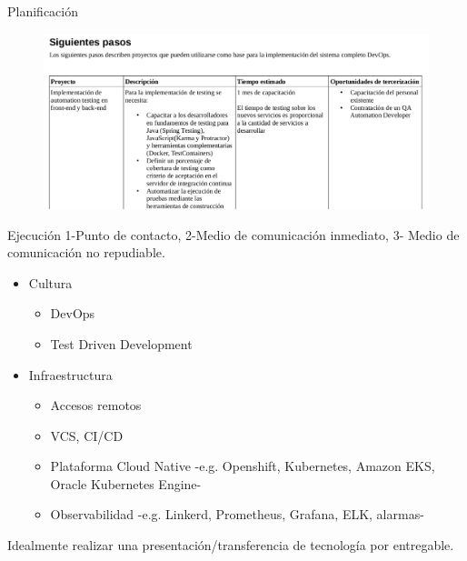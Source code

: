 \documentclass[aspectratio=169]{beamer}
\begin{document}
\begin{frame}{Planificación}
\begin{figure}
\centering
\includegraphics[width=0.8\linewidth]{Images/pasos}
\end{figure}
\end{frame}

\begin{frame}{Ejecución}
1-Punto de contacto, 2-Medio de comunicación inmediato, 3- Medio de comunicación no repudiable.


\begin{itemize}
    \item Cultura
        \begin{itemize}
        \item DevOps
        \item Test Driven Development
        \end{itemize}
    \item  Infraestructura
        \begin{itemize}
        \item Accesos remotos
        \item VCS, CI/CD
        \item Plataforma Cloud Native -e.g. Openshift, Kubernetes, Amazon EKS, Oracle Kubernetes Engine-
        \item Observabilidad -e.g. Linkerd, Prometheus, Grafana, ELK, alarmas-
        \end{itemize}
 \end{itemize}
 Idealmente realizar una presentación/transferencia de tecnología por entregable.
\end{frame}
\end{document}

